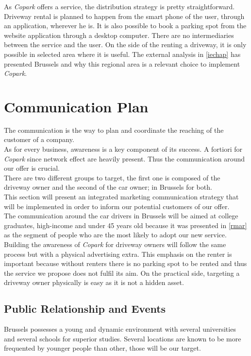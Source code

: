 \documentclass[12pt,a4paper,oneside]{book}
\newcommand{\bp}{\textit{Copark}}
\begin{document}
As \bp{} offers a service, the distribution strategy is pretty straightforward. Driveway rental is planned to happen from the smart phone of the user, through an application, wherever he is. It is also possible to book a parking spot from the website application through a desktop computer. There are no intermediaries between the service and the user. On the side of the renting a driveway, it is only possible in selected area where it is useful. The external analysis in \autoref{iechap} has presented Brussels and why this regional area is a relevant choice to implement \bp{}.

\section{Communication Plan}

The communication is the way to plan and coordinate the reaching of the customer of a company.\\

As for every business, awareness is a key component of its success. A fortiori for \bp{} since network effect are heavily present. Thus the communication around our offer is crucial.\\

There are two different groups to target, the first one is composed of the driveway owner and the second of the car owner; in Brussels for both.\\

This section will present an integrated marketing communication strategy that will be implemented in order to inform our potential customers of our offer.\\

The communication around the car drivers in Brussels will be aimed at college graduates, high-income and under 45 years old because it was presented in \autoref{rmar} as the segment of people who are the most likely to adopt our new service. Building the awareness of \bp{} for driveway owners will follow the same process but with a physical advertising extra. This emphasis on the renter is important because without renters there is no parking spot to be rented and thus the service we propose does not fulfil its aim. On the practical side, targeting a driveway owner physically is easy as it is not a hidden asset.

\subsection{Public Relationship and Events}
\label{praess}
Brussels possesses a young and dynamic environment with several universities and several schools for superior studies. Several locations are known to be more frequented by younger people than other, those will be our target.\\
\end{document}
